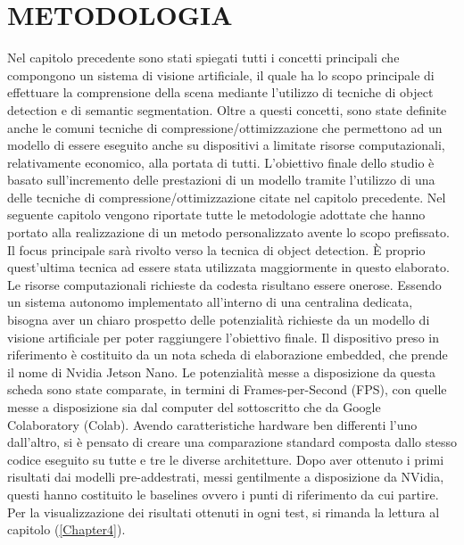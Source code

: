 
\chapter{METODOLOGIA}
\label{Capitolo3}
\thispagestyle{empty}

Nel capitolo precedente sono stati spiegati tutti i concetti principali che 
compongono un sistema di visione artificiale, il quale ha lo scopo principale 
di effettuare la comprensione della scena mediante l'utilizzo di tecniche di 
object detection e di semantic segmentation. Oltre a questi concetti, sono 
state definite anche le comuni tecniche di compressione/ottimizzazione che 
permettono ad un modello di essere eseguito anche su dispositivi a limitate 
risorse computazionali, relativamente economico, alla portata di tutti. 
L'obiettivo finale dello studio è basato sull'incremento delle prestazioni di 
un modello tramite l'utilizzo di una delle tecniche di compressione/ottimizzazione 
citate nel capitolo precedente. Nel seguente capitolo vengono 
riportate tutte le metodologie adottate che hanno portato alla realizzazione 
di un metodo personalizzato avente lo scopo prefissato. Il focus principale 
sarà rivolto verso la tecnica di object detection. È proprio quest'ultima 
tecnica ad essere stata utilizzata maggiormente in questo elaborato. Le
risorse computazionali richieste da codesta risultano essere onerose. Essendo 
un sistema autonomo implementato all'interno di una centralina dedicata, 
bisogna aver un chiaro prospetto delle potenzialità richieste da un modello di 
visione artificiale per poter raggiungere l'obiettivo finale. Il dispositivo preso 
in riferimento è costituito da un nota scheda di elaborazione embedded, che 
prende il nome di Nvidia Jetson Nano. Le potenzialità messe a disposizione 
da questa scheda sono state comparate, in termini di Frames-per-Second 
(FPS), con quelle messe a disposizione sia dal computer del sottoscritto 
che da Google Colaboratory (Colab). Avendo caratteristiche hardware ben 
differenti l'uno dall'altro, si è pensato di creare una comparazione standard 
composta dallo stesso codice eseguito su tutte e tre le diverse architetture. 
Dopo aver ottenuto i primi risultati dai modelli pre-addestrati, messi gentilmente 
a disposizione da NVidia, questi hanno costituito le baselines ovvero 
i punti di riferimento da cui partire. Per la visualizzazione dei risultati 
ottenuti in ogni test, si rimanda la lettura al capitolo (\ref{Chapter4}).


